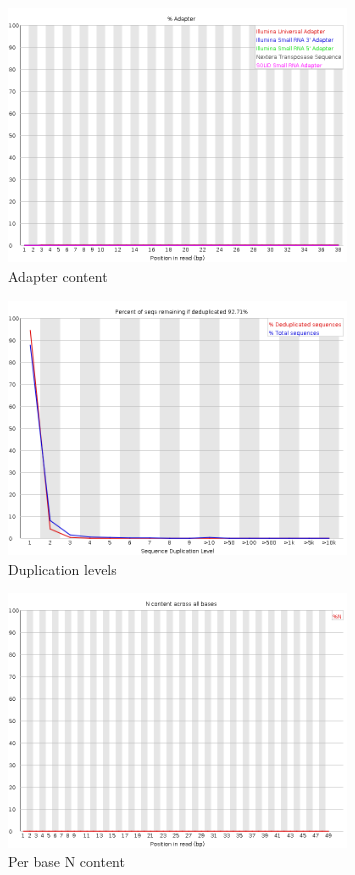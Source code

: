 \documentclass[UTF8]{ctexart}
\begin{document}
\begin{figure}[!htb]
	\centering
	\includegraphics[width=0.8\textwidth]{img/SRR14325859_FastQC_Origin_img/adapter_content.png}	%
	\caption{Adapter content\protect}    %
\end{figure}

\begin{figure}[!htb]
	\centering
	\includegraphics[width=0.8\textwidth]{img/SRR14325859_FastQC_Origin_img/duplication_levels.png}	%
	\caption{Duplication levels\protect}    %
\end{figure}

\begin{figure}[!htb]
	\centering
	\includegraphics[width=0.8\textwidth]{img/SRR14325859_FastQC_Origin_img/per_base_n_content.png}	%
	\caption{Per base N content\protect}    %
\end{figure}
\end{document}
